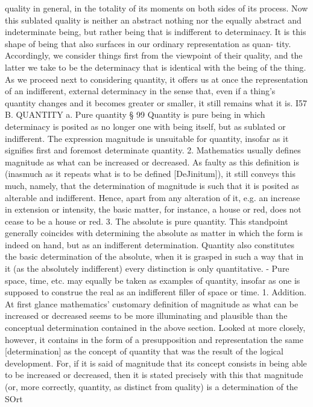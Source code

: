 quality in general, in the totality of its moments on both sides of its process.
Now this sublated quality is neither an abstract nothing nor the equally abstract
and indeterminate being, but rather being that is indifferent to determinacy. It
is this shape of being that also surfaces in our ordinary representation as quan-
tity. Accordingly, we consider things first from the viewpoint of their quality,
and the latter we take to be the determinacy that is identical with the being of
the thing. As we proceed next to considering quantity, it offers us at once the
representation of an indifferent, external determinacy in the sense that, even if a
thing's quantity changes and it becomes greater or smaller, it still remains what
it is.
I57
B. QUANTITY
a. Pure quantity
§ 99
Quantity is pure being in which determinacy is posited as no longer one
with being itself, but as sublated or indifferent.
The expression magnitude is unsuitable for quantity, insofar as it
signifies first and foremost determinate quantity. 2. Mathematics
usually defines magnitude as what can be increased or decreased. As
faulty as this definition is (inasmuch as it repeats what is to be
defined [DeJinitum]), it still conveys this much, namely, that the
determination of magnitude is such that it is posited as alterable and
indifferent. Hence, apart from any alteration of it, e.g. an increase in
extension or intensity, the basic matter, for instance, a house or red,
does not cease to be a house or red. 3. The absolute is pure quantity.
This standpoint generally coincides with determining the absolute as
matter in which the form is indeed on hand, but as an indifferent
determination. Quantity also constitutes the basic determination
of the absolute, when it is grasped in such a way that in it (as the
absolutely indifferent) every distinction is only quantitative. - Pure
space, time, etc. may equally be taken as examples of quantity,
insofar as one is supposed to construe the real as an indifferent filler
of space or time.
1.
Addition. At first glance mathematics' customary definition of magnitude as
what can be increased or decreased seems to be more illuminating and plausible
than the conceptual determination contained in the above section. Looked at more
closely, however, it contains in the form of a presupposition and representation the
same [determination] as the concept of quantity that was the result of the logical
development. For, if it is said of magnitude that its concept consists in being able
to be increased or decreased, then it is stated precisely with this that magnitude
(or, more correctly, quantity, as distinct from quality) is a determination of the SOrt
